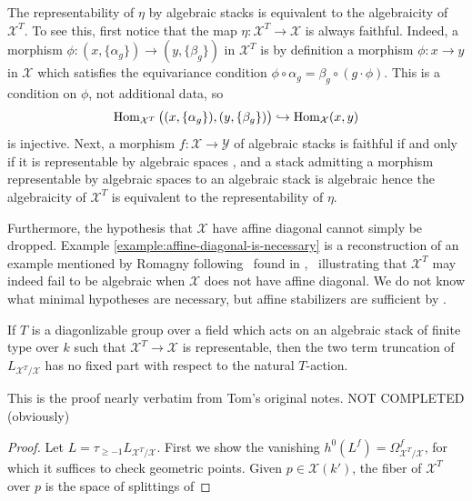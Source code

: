 \documentclass[12pt,dvipsnames]{amsart}
\newcommand{\red}[1]{\textcolor{Mahogany}{#1}}
\begin{document}
\begin{remark}\label{rmk:algebraicity-is-representability}
  The representability of \(\eta\) by algebraic stacks is equivalent to the algebraicity of \(\mathcal X^T\). To see this, first notice that the map \(\eta:\mathcal X^T\to \mathcal X\) is always faithful. Indeed, a morphism \(\phi:(x,\{\alpha_g\})\to (y,\{\beta_g\})\) in \(\mathcal X^T\) is by definition a morphism \(\phi:x\to y\) in \(\mathcal X\) which satisfies the equivariance condition \(\phi\circ \alpha_g = \beta_g \circ (g\cdot \phi)\). This is a condition on \(\phi\), not additional data, so
  \[\operatorname{Hom}_{\mathcal X^T}\big((x,\{\alpha_g\}), (y,\{\beta_g\})\big) \hookrightarrow \operatorname{Hom}_{\mathcal X}(x,y)\]
  is injective. Next, a morphism \(f:\mathcal X\to \mathcal Y\) of algebraic stacks is faithful if and only if it is representable by algebraic spaces \cite[\href{https://stacks.math.columbia.edu/tag/04Y5}{Tag 04Y5}]{stacks-project}, and a stack admitting a morphism representable by algebraic spaces to an algebraic stack is algebraic \cite[\href{https://stacks.math.columbia.edu/tag/03YS}{Tag 03YS}]{stacks-project} hence the algebraicity of \(\mathcal X^T\) is equivalent to the representability of \(\eta\).
\end{remark}
Furthermore, the hypothesis that \(\mathcal X\) have affine diagonal cannot simply be dropped. Example \ref{example:affine-diagonal-is-necessary} is a reconstruction of an example mentioned by Romagny following~\cite[Theorem 1.2.2]{romagny_AlgebraicitySmoothnessFixed2022} found in \cite[Exp. IX, Rem. 7.4]{SGA3-2},~ illustrating that \(\mathcal X^T\) may indeed fail to be algebraic when \(\mathcal X\) does not have affine diagonal. We do not know what minimal hypotheses are necessary, but affine stabilizers are sufficient by \cite[Theorem A.20]{aranha-khan-latyntsev-etal_VirtualLocalizationRevisited2025}.
\begin{lemma}\label{lem:two-term-truncation-of-fixed-locus-cotangent-complex-no-fixed-part}
  If \(T\) is a diagonlizable group over a field which acts on an algebraic stack of finite type over \(k\) such that \(\mathcal X^T\to \mathcal X\) is representable, then the two term truncation of \(L_{\mathcal X^T/\mathcal X}\) has no fixed part with respect to the natural \(T\)-action.
\end{lemma}
\red{This is the proof nearly verbatim from Tom's original notes. NOT COMPLETED (obviously)}
\begin{proof}
  Let \(L = \tau_{\geq -1}L_{\mathcal X^T/\mathcal X}\). First we show the vanishing \(h^0(L^f) = \Omega^f_{\mathcal X^T/\mathcal X}\), for which it suffices to check geometric points. Given \(p\in \mathcal X(k')\), the fiber of \(\mathcal X^T\) over \(p\) is the space of splittings of 
\end{proof}
\end{document}
